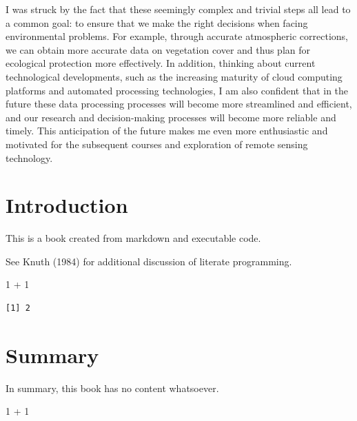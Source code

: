 \documentclass[
  letterpaper,
  DIV=11,
  numbers=noendperiod]{scrreprt}
\newenvironment{Shaded}{\begin{snugshade}}{\end{snugshade}}
\newcommand{\DecValTok}[1]{\textcolor[rgb]{0.68,0.00,0.00}{#1}}
\newcommand{\SpecialCharTok}[1]{\textcolor[rgb]{0.37,0.37,0.37}{#1}}
\begin{document}
I was struck by the fact that these seemingly complex and trivial steps
all lead to a common goal: to ensure that we make the right decisions
when facing environmental problems. For example, through accurate
atmospheric corrections, we can obtain more accurate data on vegetation
cover and thus plan for ecological protection more effectively. In
addition, thinking about current technological developments, such as the
increasing maturity of cloud computing platforms and automated
processing technologies, I am also confident that in the future these
data processing processes will become more streamlined and efficient,
and our research and decision-making processes will become more reliable
and timely. This anticipation of the future makes me even more
enthusiastic and motivated for the subsequent courses and exploration of
remote sensing technology.


\chapter{Introduction}\label{introduction}

This is a book created from markdown and executable code.

See Knuth (1984) for additional discussion of literate programming.

\begin{Shaded}
\begin{Highlighting}[]
\DecValTok{1} \SpecialCharTok{+} \DecValTok{1}
\end{Highlighting}
\end{Shaded}

\begin{verbatim}
[1] 2
\end{verbatim}


\chapter{Summary}\label{summary-2}

In summary, this book has no content whatsoever.

\begin{Shaded}
\begin{Highlighting}[]
\DecValTok{1} \SpecialCharTok{+} \DecValTok{1}
\end{Highlighting}
\end{Shaded}
\end{document}
